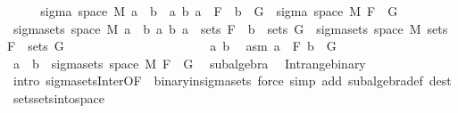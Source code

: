 \begin{isabellebody}
\ \ \isamarkupfalse%
\ \isamarkupfalse%
\ {\isachardoublequoteopen}sigma\ {\isacharparenleft}{\kern0pt}space\ M{\isacharparenright}{\kern0pt}\ {\isacharbraceleft}{\kern0pt}a\ {\isasyminter}\ b\ {\isacharbar}{\kern0pt}\ a\ b{\isachardot}{\kern0pt}\ a\ {\isasymin}\ F\ {\isasymand}\ b\ {\isasymin}\ G{\isacharbraceright}{\kern0pt}\ {\isacharequal}{\kern0pt}\ sigma\ {\isacharparenleft}{\kern0pt}space\ M{\isacharparenright}{\kern0pt}\ {\isacharparenleft}{\kern0pt}F\ {\isasymunion}\ G{\isacharparenright}{\kern0pt}{\isachardoublequoteclose}\isanewline
\ \ \isamarkupfalse%
\ {\isacharminus}{\kern0pt}\isanewline
\ \ \ \ \isamarkupfalse%
\ {\isachardoublequoteopen}sigma{\isacharunderscore}{\kern0pt}sets\ {\isacharparenleft}{\kern0pt}space\ M{\isacharparenright}{\kern0pt}\ {\isacharbraceleft}{\kern0pt}a\ {\isasyminter}\ b\ {\isacharbar}{\kern0pt}a\ b{\isachardot}{\kern0pt}\ a\ {\isasymin}\ sets\ F\ {\isasymand}\ b\ {\isasymin}\ sets\ G{\isacharbraceright}{\kern0pt}\ {\isacharequal}{\kern0pt}\ sigma{\isacharunderscore}{\kern0pt}sets\ {\isacharparenleft}{\kern0pt}space\ M{\isacharparenright}{\kern0pt}\ {\isacharparenleft}{\kern0pt}sets\ F\ {\isasymunion}\ sets\ G{\isacharparenright}{\kern0pt}{\isachardoublequoteclose}\isanewline
\ \ \ \ \isamarkupfalse%
\ {\isacharminus}{\kern0pt}\isanewline
\ \ \ \ \ \ \isacommand{{\isacharbraceleft}{\kern0pt}}\isamarkupfalse%
\isanewline
\ \ \ \ \ \ \ \ \isamarkupfalse%
\ a\ b\ \isamarkupfalse%
\ asm{\isacharcolon}{\kern0pt}\ {\isachardoublequoteopen}a\ {\isasymin}\ F{\isachardoublequoteclose}\ {\isachardoublequoteopen}b\ {\isasymin}\ G{\isachardoublequoteclose}\isanewline
\ \ \ \ \ \ \ \ \isamarkupfalse%
\ {\isachardoublequoteopen}a\ {\isasyminter}\ b\ {\isasymin}\ sigma{\isacharunderscore}{\kern0pt}sets\ {\isacharparenleft}{\kern0pt}space\ M{\isacharparenright}{\kern0pt}\ {\isacharparenleft}{\kern0pt}F\ {\isasymunion}\ G{\isacharparenright}{\kern0pt}{\isachardoublequoteclose}\ \isamarkupfalse%
\ subalgebra\ \isamarkupfalse%
\ Int{\isacharunderscore}{\kern0pt}range{\isacharunderscore}{\kern0pt}binary\ \isamarkupfalse%
\ {\isacharparenleft}{\kern0pt}intro\ sigma{\isacharunderscore}{\kern0pt}sets{\isacharunderscore}{\kern0pt}Inter{\isacharbrackleft}{\kern0pt}OF\ {\isacharunderscore}{\kern0pt}\ binary{\isacharunderscore}{\kern0pt}in{\isacharunderscore}{\kern0pt}sigma{\isacharunderscore}{\kern0pt}sets{\isacharbrackright}{\kern0pt}{\isacharparenright}{\kern0pt}\ {\isacharparenleft}{\kern0pt}force\ simp\ add{\isacharcolon}{\kern0pt}\ subalgebra{\isacharunderscore}{\kern0pt}def\ dest{\isacharcolon}{\kern0pt}\ sets{\isachardot}{\kern0pt}sets{\isacharunderscore}{\kern0pt}into{\isacharunderscore}{\kern0pt}space{\isacharparenright}{\kern0pt}{\isacharplus}{\kern0pt}\isanewline

\end{isabellebody}
